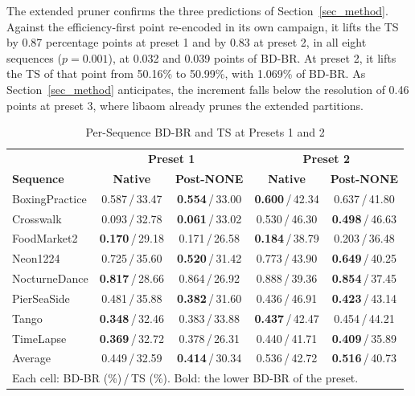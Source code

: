 \documentclass[conference]{IEEEtran}
\begin{document}
The extended pruner confirms the three predictions of
Section~\ref{sec_method}. Against the efficiency-first point re-encoded in its
own campaign, it lifts the TS by 0.87 percentage points
at preset 1 and by 0.83 at preset 2, in all eight sequences ($p = 0.001$), at
0.032 and 0.039 points of BD-BR. At preset 2, it lifts the TS of that point
from 50.16\% to 50.99\%, with 1.069\% of BD-BR. As
Section~\ref{sec_method} anticipates, the increment falls below the resolution of 0.46 points at preset
3, where libaom already prunes the extended partitions.

\begin{table}[!t]
\renewcommand{\arraystretch}{1.1}
\caption{Per-Sequence BD-BR and TS at Presets 1 and 2}
\label{tab_seq}
\centering
\setlength{\tabcolsep}{3pt}
\begin{tabular}{lcccc}
\hline
 & \multicolumn{2}{c}{\textbf{Preset 1}} & \multicolumn{2}{c}{\textbf{Preset 2}} \\
\textbf{Sequence} & \textbf{Native} & \textbf{Post-NONE} & \textbf{Native} & \textbf{Post-NONE} \\
\hline
BoxingPractice & 0.587\,/\,33.47 & \textbf{0.554}\,/\,33.00 & \textbf{0.600}\,/\,42.34 & 0.637\,/\,41.80 \\
Crosswalk      & 0.093\,/\,32.78 & \textbf{0.061}\,/\,33.02 & 0.530\,/\,46.30 & \textbf{0.498}\,/\,46.63 \\
FoodMarket2    & \textbf{0.170}\,/\,29.18 & 0.171\,/\,26.58 & \textbf{0.184}\,/\,38.79 & 0.203\,/\,36.48 \\
Neon1224       & 0.725\,/\,35.60 & \textbf{0.520}\,/\,31.42 & 0.773\,/\,43.90 & \textbf{0.649}\,/\,40.25 \\
NocturneDance  & \textbf{0.817}\,/\,28.66 & 0.864\,/\,26.92 & 0.888\,/\,39.36 & \textbf{0.854}\,/\,37.45 \\
PierSeaSide    & 0.481\,/\,35.88 & \textbf{0.382}\,/\,31.60 & 0.436\,/\,46.91 & \textbf{0.423}\,/\,43.14 \\
Tango          & \textbf{0.348}\,/\,32.46 & 0.383\,/\,33.88 & \textbf{0.437}\,/\,42.47 & 0.454\,/\,44.21 \\
TimeLapse      & \textbf{0.369}\,/\,32.72 & 0.378\,/\,26.31 & 0.440\,/\,41.71 & \textbf{0.409}\,/\,35.89 \\
\hline
Average        & 0.449\,/\,32.59 & \textbf{0.414}\,/\,30.34 & 0.536\,/\,42.72 & \textbf{0.516}\,/\,40.73 \\
\hline
\multicolumn{5}{l}{\footnotesize Each cell: BD-BR (\%)\,/\,TS (\%). Bold: the lower BD-BR of the preset.}
\end{tabular}
\end{table}
\end{document}
